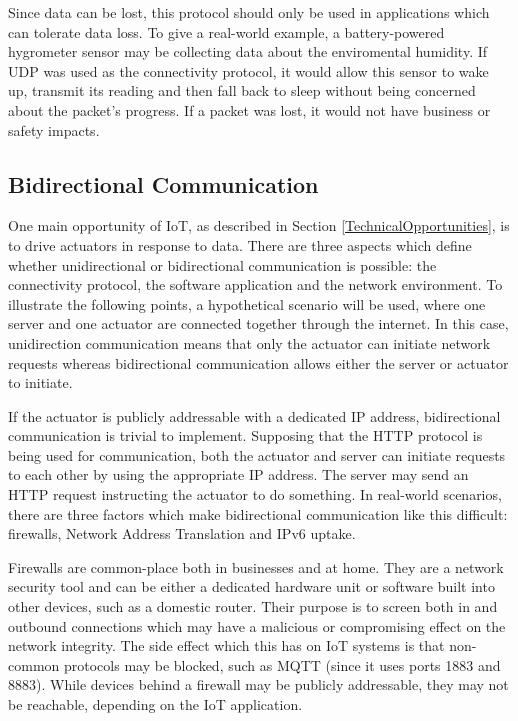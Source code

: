         Since data can be lost, this protocol should only be used in applications which can tolerate data loss. To give a real-world example, a battery-powered hygrometer sensor may be collecting data about the enviromental humidity. If UDP was used as the connectivity protocol, it would allow this sensor to wake up, transmit its reading and then fall back to sleep without being concerned about the packet's progress. If a packet was lost, it would not have business or safety impacts.

    \subsection{Bidirectional Communication}
    \label{bidirectioncomms}
      One main opportunity of IoT, as described in Section \ref{TechnicalOpportunities}, is to drive actuators in response to data. There are three aspects which define whether unidirectional or bidirectional communication is possible: the connectivity protocol, the software application and the network environment. To illustrate the following points, a hypothetical scenario will be used, where one server and one actuator are connected together through the internet. In this case, unidirection communication means that only the actuator can initiate network requests whereas bidirectional communication allows either the server or actuator to initiate.

      If the actuator is publicly addressable with a dedicated IP address, bidirectional communication is trivial to implement. Supposing that the HTTP protocol is being used for communication, both the actuator and server can initiate requests to each other by using the appropriate IP address. The server may send an HTTP request instructing the actuator to do something. In real-world scenarios, there are three factors which make bidirectional communication like this difficult: firewalls, Network Address Translation and IPv6 uptake.

      Firewalls are common-place both in businesses and at home. They are a network security tool and can be either a dedicated hardware unit or software built into other devices, such as a domestic router. Their purpose is to screen both in and outbound connections which may have a malicious or compromising effect on the network integrity. The side effect which this has on IoT systems is that non-common protocols may be blocked, such as MQTT (since it uses ports 1883 and 8883). While devices behind a firewall may be publicly addressable, they may not be reachable, depending on the IoT application.

